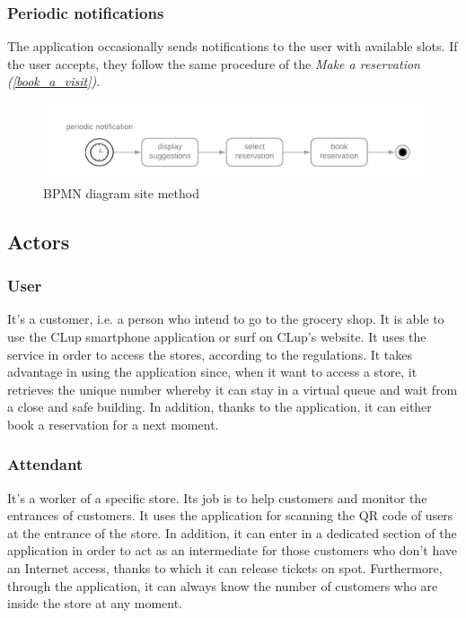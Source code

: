 \documentclass[table, 12pt]{article}
\begin{document}
\begin{flushleft}
    \subsubsection{Periodic notifications}
    The application occasionally sends notifications to the user with available slots. If the user accepts, they follow the same procedure of the \textit{Make a reservation (\ref{book_a_visit})}.
    \begin{figure}[H]
        \begin{center}
            \includegraphics[scale=0.35]{assets/periodic-notifications.png}
            \caption{BPMN diagram site method}
        \end{center}
    \end{figure}
    \subsection{Actors}
    \subsubsection{User}
    It's a customer, i.e. a person who intend to go to the grocery shop. It is able to use the CLup smartphone application or surf on CLup's website. It uses the service in order to access the stores, according to the regulations. It takes advantage in using the application since, when it want to access a store, it retrieves the unique number whereby it can stay in a virtual queue and wait from a close and safe building. In addition, thanks to the application, it can either book a reservation for a next moment.

    \subsubsection{Attendant}
    It's a worker of a specific store. Its job is to help customers and monitor the entrances of customers. It uses the application for scanning the QR code of users at the entrance of the store. In addition, it can enter in a dedicated section of the application in order to act as an intermediate for those customers who don't have an Internet access, thanks to which it can release tickets on spot. Furthermore, through the application, it can always know the number of customers who are inside the store at any moment.


\end{flushleft}
\end{document}
